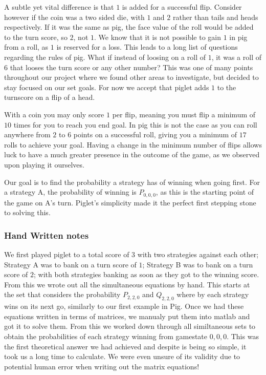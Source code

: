 \documentclass[a4paper,titlepage]{article}
\begin{document}
A subtle yet vital difference is that $1$ is added for a successful flip. Consider however if the coin was a two sided die, with $1$ and $2$ rather than tails and heads respectively.
If it was the same as pig, the face value of the roll would be added to the turn score, so $2$, not $1$. We know that it is not possible to gain $1$ in pig from a roll, as $1$ is reserved for a loss.
This leads to a long list of questions regarding the rules of pig. What if instead of loosing on a roll of $1$, it was a roll of $6$ that looses the turn score or any other number?
This was one of many points throughout our project where we found other areas to investigate, but decided to stay focused on our set goals.
For now we accept that piglet adds $1$ to the turnscore on a flip of a head.

With a coin you may only score $1$ per flip, meaning you must flip a minimum of $10$ times for you to reach you end goal. In pig this is not the case as you can roll anywhere from $2$ to $6$ points on a successful roll,
giving you a minimum of $17$ rolls to achieve your goal. Having a change in the minimum number of flips allows luck to have a much greater presence in the outcome of the game, as we observed upon playing it ourselves.

Our goal is to find the probability a strategy has of winning when going first. For a strategy A, the probability of winning is $P_{0,0,0}$, as this is the starting point of the game on A's turn.
Piglet's simplicity made it the perfect first stepping stone to solving this.

\subsubsection{Hand Written notes}
We first played piglet to a total score of $3$ with two strategies against each other; Strategy A was to bank on a turn score of $1$; Strategy B was to bank on a turn score of $2$; with both strategies banking as soon as they got to the winning score.
From this we wrote out all the simultaneous equations by hand. This starts at the set that considers the probability $P_{2,2,0}$ and $Q_{2,2,0}$ where by each strategy wins on its next go, similarly to our first example in Pig.
Once we had these equations written in terms of matrices, we manualy put them into matlab and got it to solve them. From this we worked down through all similtaneous sets to obtain the probabilities of each strategy winning from gamestate $0,0,0$.
This was the first theoretical answer we had achieved and despite is being so simple, it took us a long time to calculate. We were even unsure of its validity due to potential human error when writing out the matrix equations!
\end{document}

